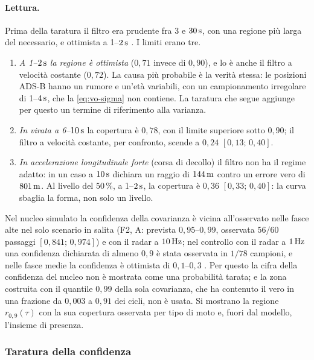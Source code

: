 \paragraph{Lettura.} Prima della taratura il filtro era prudente fra $3$ e $30\,\mathrm{s}$, con una regione più larga del necessario, e ottimista a 1--$2\,\mathrm{s}$ . I limiti erano tre.
\begin{enumerate}[label=\arabic*.]
\item \emph{A 1--$2\,\mathrm{s}$ la regione è ottimista} ($0{,}71$ invece di $0{,}90$), e lo è anche il filtro a velocità costante ($0{,}72$). La causa più probabile è la verità stessa: le posizioni ADS-B hanno un rumore e un'età variabili, con un campionamento irregolare di 1--$4\,\mathrm{s}$, che la \eqref{eq:vo-sigma} non contiene. La taratura che segue aggiunge per questo un termine di riferimento alla varianza.
\item \emph{In virata a 6--$10\,\mathrm{s}$} la copertura è $0{,}78$, con il limite superiore sotto $0{,}90$; il filtro a velocità costante, per confronto, scende a $0{,}24$ $[0{,}13;\,0{,}40]$.
\item \emph{In accelerazione longitudinale forte} (corsa di decollo) il filtro non ha il regime adatto: in un caso a $10\,\mathrm{s}$ dichiara un raggio di $144\,\mathrm{m}$ contro un errore vero di $801\,\mathrm{m}$. Al livello del $50\,\%$, a 1--$2\,\mathrm{s}$, la copertura è $0{,}36$ $[0{,}33;\,0{,}40]$: la curva sbaglia la forma, non solo un livello.
\end{enumerate}
Nel nucleo simulato la confidenza della covarianza è vicina all'osservato nelle fasce alte nel solo scenario in salita (F2, A: prevista $0{,}95$--$0{,}99$, osservata $56/60$ passaggi $[0{,}841;\,0{,}974]$) e con il radar a $10\,\mathrm{Hz}$; nel controllo con il radar a $1\,\mathrm{Hz}$ una confidenza dichiarata di almeno $0{,}9$ è stata osservata in $1/78$ campioni, e nelle fasce medie la confidenza è ottimista di $0{,}1$--$0{,}3$ . Per questo la cifra della confidenza del nucleo non è mostrata come una probabilità tarata; e la zona costruita con il quantile $0{,}99$ della sola covarianza, che ha contenuto il vero in una frazione da $0{,}003$ a $0{,}91$ dei cicli, non è usata. Si mostrano la regione $r_{0,9}(\tau)$ con la sua copertura osservata per tipo di moto e, fuori dal modello, l'insieme di presenza.
\subsubsection{Taratura della confidenza}\label{sec:vo-taratura}

